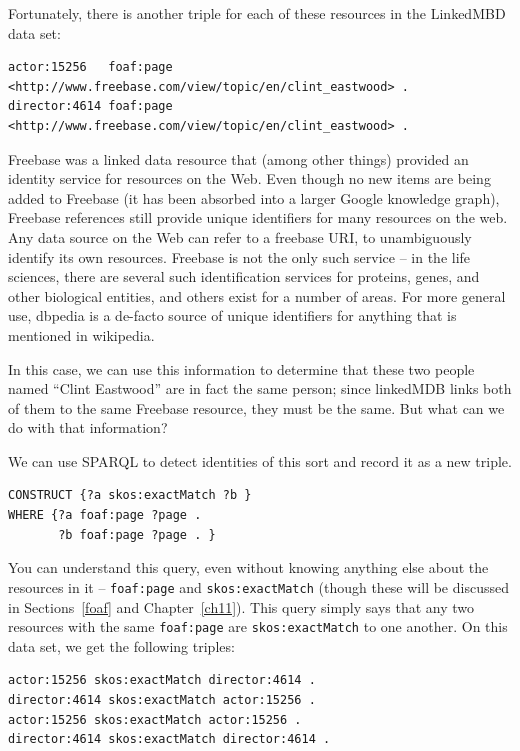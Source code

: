 \begin{challenge}
Fortunately, there is another triple for each of these resources in the
LinkedMBD data set:

\begin{lstlisting}
actor:15256   foaf:page  <http://www.freebase.com/view/topic/en/clint_eastwood> .
director:4614 foaf:page  <http://www.freebase.com/view/topic/en/clint_eastwood> .
\end{lstlisting}

Freebase was a linked data resource that (among other things) provided an
identity service for resources on the Web. Even though no new items are being added to Freebase
(it has been absorbed into a larger Google knowledge graph), Freebase references still provide unique
identifiers for many resources on the web. 
Any data source on the Web
can refer to a freebase URI, to unambiguously identify its own
resources. Freebase is not the only such service -- in the life
sciences, there are several such identification services for proteins,
genes, and other biological entities, and others exist for a number of
areas.  For more general use, dbpedia is a de-facto source of unique identifiers for anything that
is mentioned in wikipedia. 

In this case, we can use this information to determine that these two
people named ``Clint Eastwood'' are in fact the same person; since
linkedMDB links both of them to the same Freebase resource, they must be
the same. But what can we do with that information?

We can use SPARQL to detect identities of this sort and record it as a
new triple.

\begin{lstlisting}
CONSTRUCT {?a skos:exactMatch ?b }
WHERE {?a foaf:page ?page .
       ?b foaf:page ?page . }
\end{lstlisting}

You can understand this query, even without knowing anything else about
the resources in it -- \texttt{foaf:page} and \texttt{skos:exactMatch} (though these will
be discussed in Sections~\ref{foaf} and Chapter~\ref{ch11}). This query simply says that any two
resources with the same \texttt{foaf:page} are \texttt{skos:exactMatch} to one another. On
this data set, we get the following triples:

\begin{lstlisting}
actor:15256 skos:exactMatch director:4614 .
director:4614 skos:exactMatch actor:15256 .
actor:15256 skos:exactMatch actor:15256 .
director:4614 skos:exactMatch director:4614 .
\end{lstlisting}


\end{challenge}

